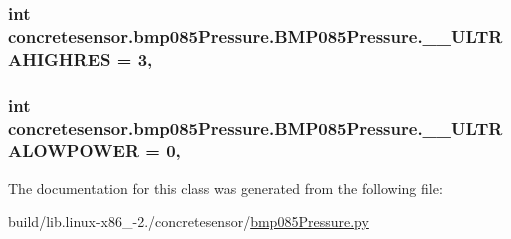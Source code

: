 \subsubsection[{\+\_\+\+\_\+\+U\+L\+T\+R\+A\+H\+I\+G\+H\+R\+E\+S}]{\setlength{\rightskip}{0pt plus 5cm}int concretesensor.\+bmp085\+Pressure.\+B\+M\+P085\+Pressure.\+\_\+\+\_\+\+U\+L\+T\+R\+A\+H\+I\+G\+H\+R\+E\+S = 3\hspace{0.3cm}{\ttfamily [static]}, {\ttfamily [private]}}\label{classconcretesensor_1_1bmp085Pressure_1_1BMP085Pressure_a7fa3a2424fd53bbe52796786cda2b6e5}
\hypertarget{classconcretesensor_1_1bmp085Pressure_1_1BMP085Pressure_a9079765c87aea01aa4fbfd08a924166c}{}
\subsubsection[{\+\_\+\+\_\+\+U\+L\+T\+R\+A\+L\+O\+W\+P\+O\+W\+E\+R}]{\setlength{\rightskip}{0pt plus 5cm}int concretesensor.\+bmp085\+Pressure.\+B\+M\+P085\+Pressure.\+\_\+\+\_\+\+U\+L\+T\+R\+A\+L\+O\+W\+P\+O\+W\+E\+R = 0\hspace{0.3cm}{\ttfamily [static]}, {\ttfamily [private]}}\label{classconcretesensor_1_1bmp085Pressure_1_1BMP085Pressure_a9079765c87aea01aa4fbfd08a924166c}


The documentation for this class was generated from the following file\+:\begin{DoxyCompactItemize}
\item 
build/lib.\+linux-\/x86\+\_-\/2./concretesensor/\hyperlink{build_2lib_8linux-x86__64-2_87_2concretesensor_2bmp085Pressure_8py}{bmp085\+Pressure.\+py}\end{DoxyCompactItemize}
